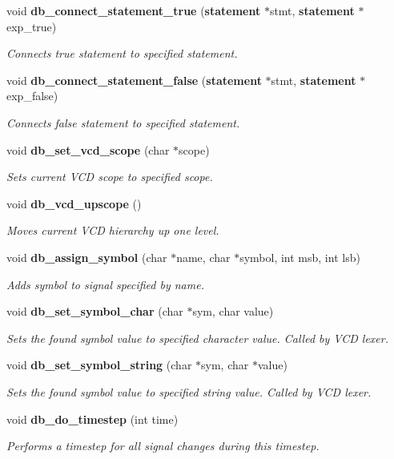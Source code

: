\begin{CompactItemize}
void {\bf db\_\-connect\_\-statement\_\-true} ({\bf statement} $\ast$stmt, {\bf statement} $\ast$exp\_\-true)
\begin{CompactList}\small\item\em Connects true statement to specified statement.\item\end{CompactList}\item 
void {\bf db\_\-connect\_\-statement\_\-false} ({\bf statement} $\ast$stmt, {\bf statement} $\ast$exp\_\-false)
\begin{CompactList}\small\item\em Connects false statement to specified statement.\item\end{CompactList}\item 
void {\bf db\_\-set\_\-vcd\_\-scope} (char $\ast$scope)
\begin{CompactList}\small\item\em Sets current VCD scope to specified scope.\item\end{CompactList}\item 
void {\bf db\_\-vcd\_\-upscope} ()
\begin{CompactList}\small\item\em Moves current VCD hierarchy up one level.\item\end{CompactList}\item 
void {\bf db\_\-assign\_\-symbol} (char $\ast$name, char $\ast$symbol, int msb, int lsb)
\begin{CompactList}\small\item\em Adds symbol to signal specified by name.\item\end{CompactList}\item 
void {\bf db\_\-set\_\-symbol\_\-char} (char $\ast$sym, char value)
\begin{CompactList}\small\item\em Sets the found symbol value to specified character value. Called by VCD lexer.\item\end{CompactList}\item 
void {\bf db\_\-set\_\-symbol\_\-string} (char $\ast$sym, char $\ast$value)
\begin{CompactList}\small\item\em Sets the found symbol value to specified string value. Called by VCD lexer.\item\end{CompactList}\item 
void {\bf db\_\-do\_\-timestep} (int time)
\begin{CompactList}\small\item\em Performs a timestep for all signal changes during this timestep.\item\end{CompactList}\end{CompactItemize}


